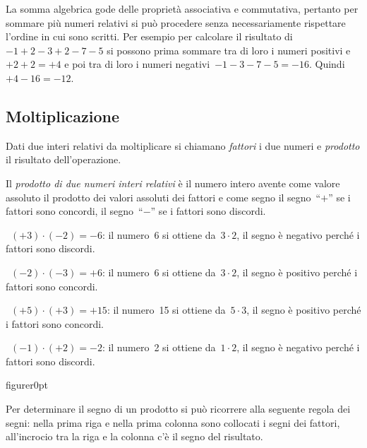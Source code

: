 La somma algebrica gode delle proprietà associativa e commutativa, pertanto per sommare più numeri relativi
si può procedere senza necessariamente rispettare l'ordine in cui sono scritti. Per esempio per calcolare
il risultato di~$-1+2-3+2-7-5$ si possono prima sommare tra di loro i numeri positivi e~$+2+2=+4$
e poi tra di loro i numeri negativi~$-1-3-7-5=-16$. Quindi~$+4-16=-12$.

\vspazio\ovalbox{\risolvii \ref{ese:2.14}, \ref{ese:2.15}}

\subsection{Moltiplicazione}

Dati due interi relativi da moltiplicare si chiamano \emph{fattori} i due numeri e \emph{prodotto} il
risultato dell'operazione.

Il \emph{prodotto di due numeri interi relativi} è il numero intero avente come valore assoluto il prodotto
dei valori assoluti dei fattori e come segno il segno~``$+$'' se i fattori sono concordi,
il segno~``$-$'' se i fattori sono discordi.

\begin{exrig}
 \begin{esempio}
~$(+3)\cdot(-2)=-6$: il numero~6 si ottiene da~$3\cdot2$, il segno è negativo perché i fattori sono discordi.
 \end{esempio}

 \begin{esempio}
~$(-2)\cdot(-3)=+6$: il numero~6 si ottiene da~$3\cdot2$, il segno è positivo perché i fattori sono concordi.
 \end{esempio}
 \begin{esempio}
~$(+5)\cdot(+3)=+15$: il numero~15 si ottiene da~$5\cdot3$, il segno è positivo perché i fattori sono concordi.
 \end{esempio}
 \begin{esempio}
~$(-1)\cdot(+2)=-2$: il numero~2 si ottiene da~$1\cdot2$, il segno è negativo perché i fattori sono discordi.
 \end{esempio}

\end{exrig}

\begin{wrapfloat}{figure}{r}{0pt}

\end{wrapfloat}
Per determinare il segno di un prodotto si può ricorrere alla seguente regola dei segni: nella prima riga e
nella prima colonna sono collocati i segni dei fattori, all'incrocio tra la riga e la colonna c'è il segno
del risultato.


